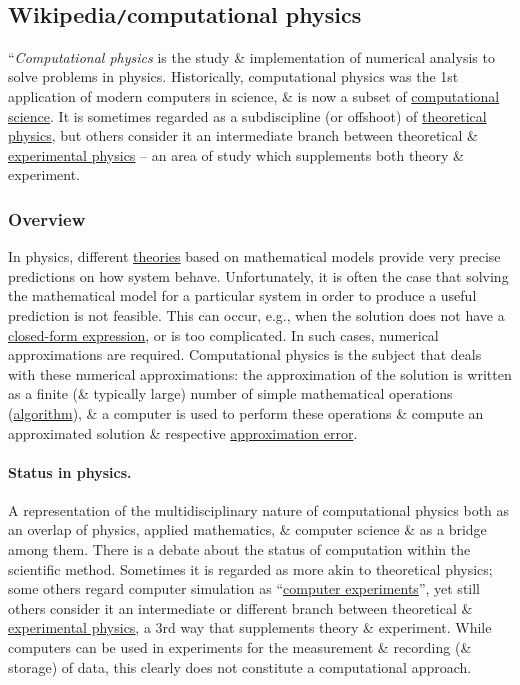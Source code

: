\documentclass{article}
\begin{document}
\subsection{Wikipedia{\tt/}computational physics}
``{\it Computational physics} is the study \& implementation of numerical analysis to solve problems in physics. Historically, computational physics was the 1st application of modern computers in science, \& is now a subset of \href{https://en.wikipedia.org/wiki/Computational_science}{computational science}. It is sometimes regarded as a subdiscipline (or offshoot) of \href{https://en.wikipedia.org/wiki/Theoretical_physics}{theoretical physics}, but others consider it an intermediate branch between theoretical \& \href{https://en.wikipedia.org/wiki/Experimental_physics}{experimental physics} -- an area of study which supplements both theory \& experiment.

\subsubsection{Overview}
In physics, different \href{https://en.wikipedia.org/wiki/Theory}{theories} based on mathematical models provide very precise predictions on how system behave. Unfortunately, it is often the case that solving the mathematical model for a particular system in order to produce a useful prediction is not feasible. This can occur, e.g., when the solution does not have a \href{https://en.wikipedia.org/wiki/Closed-form_expression}{closed-form expression}, or is too complicated. In such cases, numerical approximations are required. Computational physics is the subject that deals with these numerical approximations: the approximation of the solution is written as a finite (\& typically large) number of simple mathematical operations (\href{https://en.wikipedia.org/wiki/Algorithm}{algorithm}), \& a computer is used to perform these operations \& compute an approximated solution \& respective \href{https://en.wikipedia.org/wiki/Approximation_error}{approximation error}.

\paragraph{Status in physics.} {\sf A representation of the multidisciplinary nature of computational physics both as an overlap of physics, applied mathematics, \& computer science \& as a bridge among them.} There is a debate about the status of computation within the scientific method. Sometimes it is regarded as more akin to theoretical physics; some others regard computer simulation as ``\href{https://en.wikipedia.org/wiki/Computer_experiment}{computer experiments}'', yet still others consider it an intermediate or different branch between theoretical \& \href{https://en.wikipedia.org/wiki/Experimental_physics}{experimental physics}, a 3rd way that supplements theory \& experiment. While computers can be used in experiments for the measurement \& recording (\& storage) of data, this clearly does not constitute a computational approach.
\end{document}
